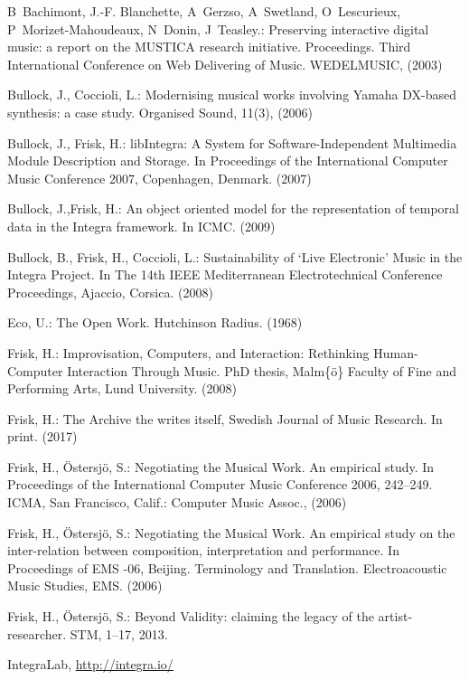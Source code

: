 \documentclass[runningheads,a4paper]{llncs}
\begin{document}


\begin{thebibliography}{99}
B~Bachimont, J.-F. Blanchette, A~Gerzso, A~Swetland, O~Lescurieux,
  P~Morizet-Mahoudeaux, N~Donin, J~Teasley.: Preserving interactive digital music: a report on the MUSTICA
  research initiative. Proceedings. Third International Conference on Web Delivering
  of Music. WEDELMUSIC, (2003)

Bullock, J., Coccioli, L.:
Modernising musical works involving Yamaha DX-based synthesis: a
  case study. Organised Sound, 11(3), (2006)

Bullock, J., Frisk, H.: libIntegra: A System for Software-Independent Multimedia Module
  Description and Storage. In Proceedings of the International Computer Music Conference
  2007, Copenhagen, Denmark. (2007)

Bullock, J.,Frisk, H.: An object oriented model for the representation of temporal data in
  the Integra framework. In ICMC. (2009)

Bullock, B., Frisk, H., Coccioli, L.: Sustainability of `Live Electronic' Music in the Integra Project.
In The 14th IEEE Mediterranean Electrotechnical Conference
  Proceedings, Ajaccio, Corsica. (2008)

 Eco, U.: The Open Work. Hutchinson Radius. (1968)

 Frisk, H.: Improvisation, Computers, and Interaction: Rethinking Human-Computer Interaction Through Music. PhD thesis, Malm{\{}{\"{o}}{\}} Faculty of Fine and Performing Arts,
  Lund University. (2008)

 Frisk, H.: The Archive the writes itself, Swedish Journal of Music Research. In print. (2017)

Frisk, H., Östersjö, S.: Negotiating the Musical Work. An empirical study.
In Proceedings of the International Computer Music Conference
  2006, 242--249. ICMA, San Francisco, Calif.: Computer Music Assoc.,
  (2006)

Frisk, H., Östersjö, S.: Negotiating the Musical Work. An empirical study on the inter-relation between composition, interpretation and performance.
In Proceedings of EMS -06, Beijing. Terminology and Translation. Electroacoustic Music Studies, EMS. (2006)

Frisk, H., Östersjö, S.: Beyond Validity: claiming the legacy of the artist-researcher.
STM, 1--17, 2013.

 IntegraLab, \url{http://integra.io/}

\end{thebibliography}
\end{document}

